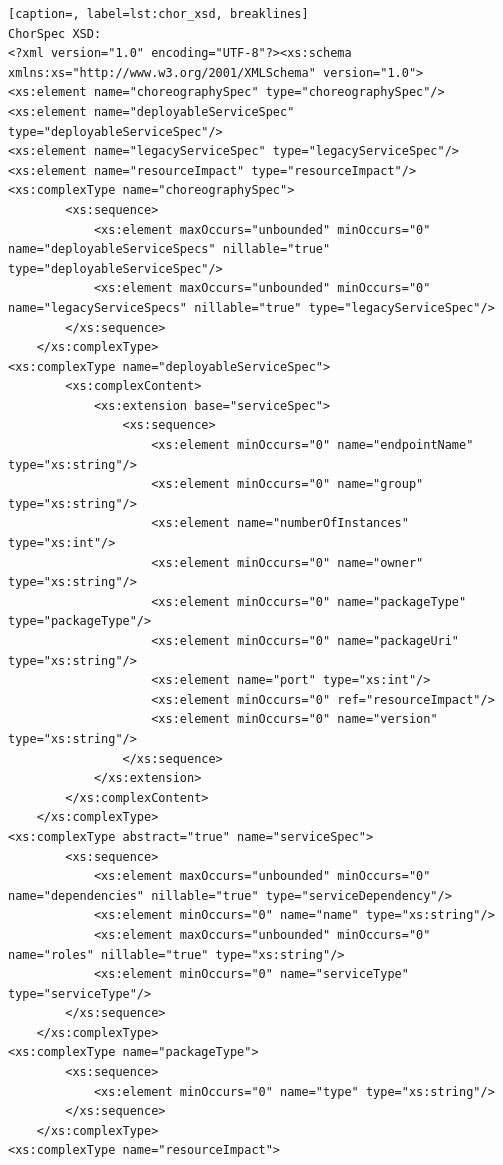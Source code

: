 {\footnotesize

\lstset{language=XML}

\begin{lstlisting}[caption=, label=lst:chor_xsd, breaklines]
ChorSpec XSD:
<?xml version="1.0" encoding="UTF-8"?><xs:schema xmlns:xs="http://www.w3.org/2001/XMLSchema" version="1.0">
<xs:element name="choreographySpec" type="choreographySpec"/>
<xs:element name="deployableServiceSpec" type="deployableServiceSpec"/>
<xs:element name="legacyServiceSpec" type="legacyServiceSpec"/>
<xs:element name="resourceImpact" type="resourceImpact"/>
<xs:complexType name="choreographySpec">
        <xs:sequence>
            <xs:element maxOccurs="unbounded" minOccurs="0" name="deployableServiceSpecs" nillable="true" type="deployableServiceSpec"/>
            <xs:element maxOccurs="unbounded" minOccurs="0" name="legacyServiceSpecs" nillable="true" type="legacyServiceSpec"/>
        </xs:sequence>
    </xs:complexType>
<xs:complexType name="deployableServiceSpec">
        <xs:complexContent>
            <xs:extension base="serviceSpec">
                <xs:sequence>
                    <xs:element minOccurs="0" name="endpointName" type="xs:string"/>
                    <xs:element minOccurs="0" name="group" type="xs:string"/>
                    <xs:element name="numberOfInstances" type="xs:int"/>
                    <xs:element minOccurs="0" name="owner" type="xs:string"/>
                    <xs:element minOccurs="0" name="packageType" type="packageType"/>
                    <xs:element minOccurs="0" name="packageUri" type="xs:string"/>
                    <xs:element name="port" type="xs:int"/>
                    <xs:element minOccurs="0" ref="resourceImpact"/>
                    <xs:element minOccurs="0" name="version" type="xs:string"/>
                </xs:sequence>
            </xs:extension>
        </xs:complexContent>
    </xs:complexType>
<xs:complexType abstract="true" name="serviceSpec">
        <xs:sequence>
            <xs:element maxOccurs="unbounded" minOccurs="0" name="dependencies" nillable="true" type="serviceDependency"/>
            <xs:element minOccurs="0" name="name" type="xs:string"/>
            <xs:element maxOccurs="unbounded" minOccurs="0" name="roles" nillable="true" type="xs:string"/>
            <xs:element minOccurs="0" name="serviceType" type="serviceType"/>
        </xs:sequence>
    </xs:complexType>
<xs:complexType name="packageType">
        <xs:sequence>
            <xs:element minOccurs="0" name="type" type="xs:string"/>
        </xs:sequence>
    </xs:complexType>
<xs:complexType name="resourceImpact">

\end{lstlisting}}
